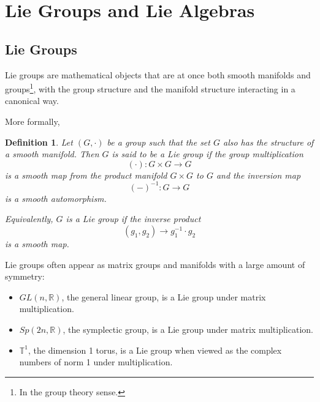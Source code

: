 \documentclass{tufte-handout}
\newtheorem{defn}{Definition}
\begin{document}
\section{Lie Groups and Lie Algebras}
\subsection{Lie Groups}
Lie groups are mathematical objects that are at once both smooth manifolds and groups\footnote{In the group theory sense.}, with the group structure and the manifold structure interacting in a canonical way.

More formally,
\begin{fullwidth}
\begin{defn}
Let $(G,\cdot)$ be a group such that the set $G$ also has the structure of a smooth manifold. Then $G$ is said to be a \emph{Lie group} if the group multiplication
$$
(\cdot): G \times G \to G
$$
is a smooth map from the product manifold $G \times G$ to $G$ and the inversion map
$$
(-)^{-1}: G \to G
$$
is a smooth automorphism.

Equivalently, $G$ is a Lie group if the inverse product
$$
(g_1,g_2) \to g_1^{-1}\cdot g_2
$$
is a smooth map.
\end{defn}
\end{fullwidth}

Lie groups often appear as matrix groups and manifolds with a large amount of symmetry:
\begin{itemize}
\item $GL(n,\mathbb{R})$, the general linear group, is a Lie group under matrix multiplication.

\item $Sp(2n,\mathbb{R})$, the symplectic group, is a Lie group under matrix multiplication.

\item $\mathbb{T}^1$, the dimension 1 torus, is a Lie group when viewed as the complex numbers of norm 1 under multiplication.
\end{itemize}
\end{document}
